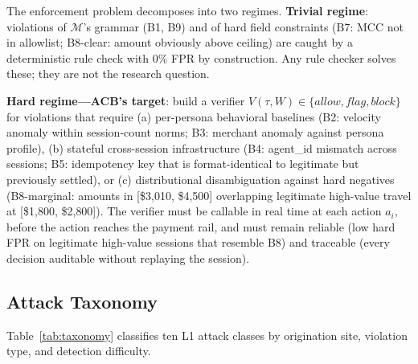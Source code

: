 \documentclass{article}
\begin{document}
The enforcement problem decomposes into two regimes. \textbf{Trivial regime}: violations of $\mathcal{M}$'s grammar (B1, B9) and of hard field constraints (B7: MCC not in allowlist; B8-clear: amount obviously above ceiling) are caught by a deterministic rule check with 0\% FPR by construction. Any rule checker solves these; they are not the research question.

\textbf{Hard regime---ACB's target}: build a verifier $V(\tau, W) \in \{\textit{allow}, \textit{flag}, \textit{block}\}$ for violations that require (a) per-persona behavioral baselines (B2: velocity anomaly within session-count norms; B3: merchant anomaly against persona profile), (b) stateful cross-session infrastructure (B4: agent\_id mismatch across sessions; B5: idempotency key that is format-identical to legitimate but previously settled), or (c) distributional disambiguation against hard negatives (B8-marginal: amounts in [\$3{,}010, \$4{,}500] overlapping legitimate high-value travel at [\$1{,}800, \$2{,}800]). The verifier must be callable in real time at each action $a_i$, before the action reaches the payment rail, and must remain reliable (low hard FPR on legitimate high-value sessions that resemble B8) and traceable (every decision auditable without replaying the session).

\subsection{Attack Taxonomy}
\label{sec:taxonomy}

Table~\ref{tab:taxonomy} classifies ten L1 attack classes by origination site,
violation type, and detection difficulty.
\end{document}
